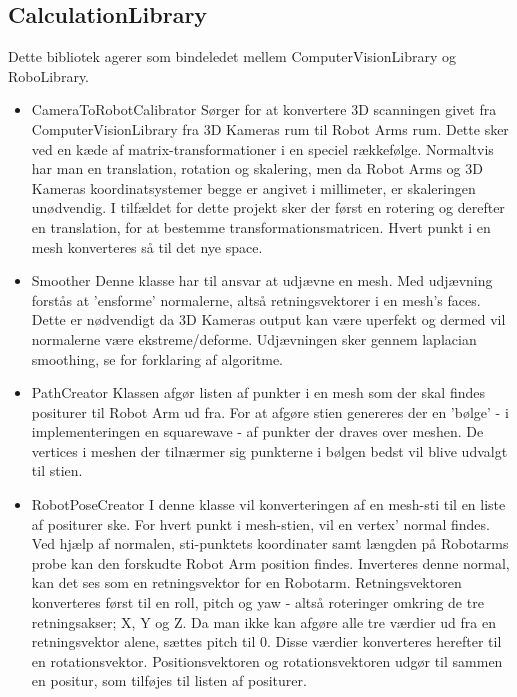 \subsection{CalculationLibrary}
Dette bibliotek agerer som bindeledet mellem ComputerVisionLibrary og RoboLibrary.

\begin{itemize}
\item{CameraToRobotCalibrator} 
Sørger for at konvertere 3D scanningen givet fra ComputerVisionLibrary fra 3D Kameras rum til Robot Arms rum.
Dette sker ved en kæde af matrix-transformationer i en speciel rækkefølge. 
Normaltvis har man en translation, rotation og skalering, men da Robot Arms og 3D Kameras koordinatsystemer begge er angivet i millimeter, er skaleringen unødvendig.
I tilfældet for dette projekt sker der først en rotering og derefter en translation, for at bestemme transformationsmatricen. 
Hvert punkt i en mesh konverteres så til det nye space.

\item{Smoother}
Denne klasse har til ansvar at udjævne en mesh. Med udjævning forstås at 'ensforme' normalerne, altså retningsvektorer i en mesh's faces.
Dette er nødvendigt da 3D Kameras output kan være uperfekt og dermed vil normalerne være ekstreme/deforme. Udjævningen sker gennem laplacian smoothing, se \cite{Smooth} for forklaring af algoritme.

\item{PathCreator}
Klassen afgør listen af punkter i en mesh som der skal findes positurer til Robot Arm ud fra.
For at afgøre stien genereres der en 'bølge' - i implementeringen en squarewave - af punkter der draves over meshen.
De vertices i meshen der tilnærmer sig punkterne i bølgen bedst vil blive udvalgt til stien.

\item{RobotPoseCreator}
I denne klasse vil konverteringen af en mesh-sti til en liste af positurer ske.
For hvert punkt i mesh-stien, vil en vertex' normal findes. 
Ved hjælp af normalen, sti-punktets koordinater samt længden på Robotarms probe kan den forskudte Robot Arm position findes.
Inverteres denne normal, kan det ses som en retningsvektor for en Robotarm.
Retningsvektoren konverteres først til en roll, pitch og yaw - altså roteringer omkring de tre retningsakser; X, Y og Z.
Da man ikke kan afgøre alle tre værdier ud fra en retningsvektor alene, sættes pitch til 0. Disse værdier konverteres herefter til en rotationsvektor.
Positionsvektoren og rotationsvektoren udgør til sammen en positur, som tilføjes til listen af positurer.
\end{itemize}

